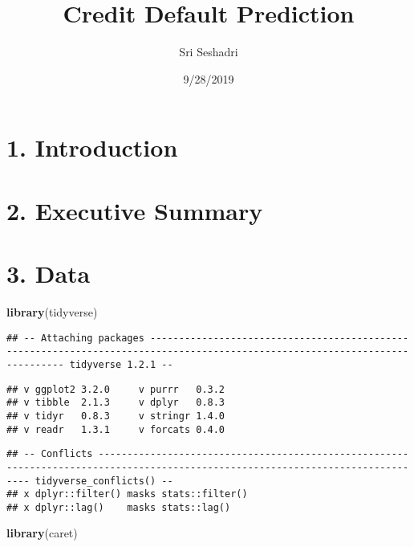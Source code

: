 \documentclass[]{article}
\title{Credit Default Prediction}
\author{Sri Seshadri}
\date{9/28/2019}
\newenvironment{Shaded}{\begin{snugshade}}{\end{snugshade}}
\newcommand{\KeywordTok}[1]{\textcolor[rgb]{0.13,0.29,0.53}{\textbf{#1}}}
\newcommand{\NormalTok}[1]{#1}
\begin{document}
\maketitle

\hypertarget{introduction}{%
\section{1. Introduction}\label{introduction}}

\hypertarget{executive-summary}{%
\section{2. Executive Summary}\label{executive-summary}}

\hypertarget{data}{%
\section{3. Data}\label{data}}

\begin{Shaded}
\begin{Highlighting}[]
\KeywordTok{library}\NormalTok{(tidyverse)}
\end{Highlighting}
\end{Shaded}

\begin{verbatim}
## -- Attaching packages ----------------------------------------------------------------------------------------------------------------------------- tidyverse 1.2.1 --
\end{verbatim}

\begin{verbatim}
## v ggplot2 3.2.0     v purrr   0.3.2
## v tibble  2.1.3     v dplyr   0.8.3
## v tidyr   0.8.3     v stringr 1.4.0
## v readr   1.3.1     v forcats 0.4.0
\end{verbatim}

\begin{verbatim}
## -- Conflicts -------------------------------------------------------------------------------------------------------------------------------- tidyverse_conflicts() --
## x dplyr::filter() masks stats::filter()
## x dplyr::lag()    masks stats::lag()
\end{verbatim}

\begin{Shaded}
\begin{Highlighting}[]
\KeywordTok{library}\NormalTok{(caret)}
\end{Highlighting}
\end{Shaded}
\end{document}
